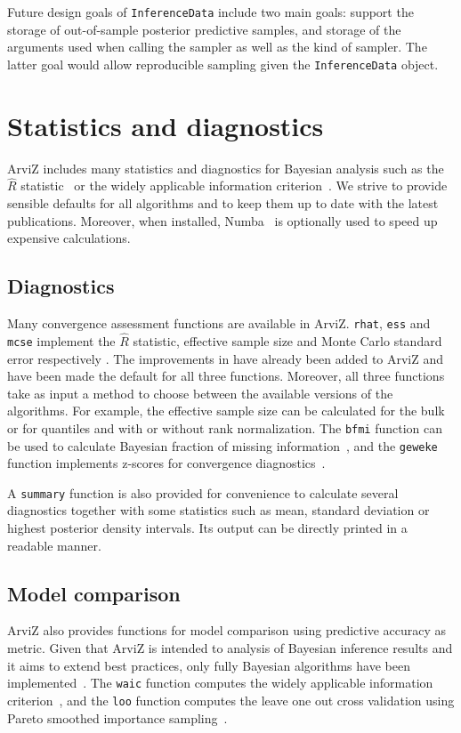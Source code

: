 \documentclass[anonymous=false, %
               format=acmsmall, %
               review=true, %
               screen=true, %
               nonacm=true]{acmart}
\begin{document}
Future design goals of \texttt{InferenceData} include two main goals:
support the storage of out-of-sample posterior predictive samples,
and storage of the arguments used
when calling the sampler as well as the kind of sampler. The latter goal
would allow reproducible sampling given the \texttt{InferenceData} object.

\section{Statistics and diagnostics}\label{sec:stats}
ArviZ includes many statistics and diagnostics for Bayesian
analysis such as the $\hat{R}$ statistic~\cite{gelman1992rhat, vehtari2019rank} or the
widely applicable information criterion~\cite{watanabe2010waic}.
We strive to provide sensible defaults for all algorithms and to
keep them up to date with the latest publications. Moreover, when installed,
Numba~\cite{lam2015numba} is optionally used to
speed up expensive calculations.

\subsection{Diagnostics}
Many convergence assessment functions are available in ArviZ.
\texttt{rhat}, \texttt{ess} and \texttt{mcse}
implement the $\hat{R}$ statistic, effective sample size and Monte Carlo
standard error respectively \cite{gelman1992rhat, gelman2013bayesian}. %
The improvements in \citet{vehtari2019rank} have already been added to
ArviZ and have been made the default for all three functions. Moreover, all
three functions take
as input a method to choose between the available versions of the algorithms.
For example, the effective sample size can be calculated for the bulk or for
quantiles and with or without rank normalization.
The \texttt{bfmi} function can be used to calculate Bayesian fraction
of missing information~\cite{betancourt2016diagnosing}, and the \texttt{geweke} function
implements z-scores for convergence diagnostics~\cite{geweke1991evaluating}.

A \texttt{summary} function is also provided for convenience to calculate
several diagnostics together with some statistics such as mean, standard deviation
or highest posterior density intervals.
Its output can be directly printed in a readable manner.

\subsection{Model comparison}
ArviZ also provides functions for model comparison using predictive
accuracy as metric. Given that ArviZ is intended to analysis of Bayesian
inference results and it aims to extend best practices, only fully
Bayesian algorithms have been implemented~\cite{gelman2014understanding}.
The \texttt{waic} function computes the
widely applicable information criterion~\cite{watanabe2010waic}, and the
\texttt{loo} function computes the leave one out cross validation using Pareto
smoothed importance sampling~\cite{vehtari2015pareto, vehtari2017practical}.
\end{document}
